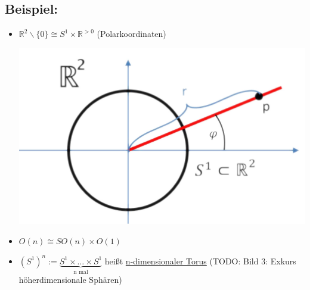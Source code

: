 \documentclass[a4paper,11pt,notitlepage]{report}
\theoremstyle{definition}
\newcommand{\R}{{\ensuremath{\mathbb{R}}}}
\newenvironment{bsp}[1]
{
\setlength{\fboxsep}{10pt}
\subsection*{Beispiel: #1}
\begin{upshape}
}
{
\end{upshape}
}
\begin{document}
\begin{bsp}{}
	\begin{itemize}
		\item $\R^2 \backslash \{0\} \cong S^1 \times \R^{> 0}$ (Polarkoordinaten) \newline
		\begin{center}		
			\includegraphics[scale=0.4]{images/Polarkoordinaten.png}
		\end{center}
		\item $O(n) \cong SO(n) \times O(1)$
		\item $(S^1)^n :=  \underbrace{S^1 \times \ldots \times S^1}_{\text{n mal}}$ heißt \underline{n-dimensionaler Torus} (TODO: Bild 3: Exkurs höherdimensionale Sphären)
	\end{itemize}
\end{bsp}

\newpage
\end{document}
